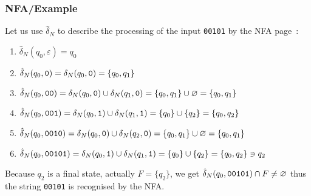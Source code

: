 % 
\begin{frame}[containsverbatim]
\frametitle{NFA/Example}

\label{nfa_01_suffix_formal}

Let us use \(\hat{\delta}_N\) to describe the processing of the input
\verb+00101+ by the NFA page~\pageref{nfa_01_suffix}:
\begin{enumerate}

  \item \(\hat{\delta}_N (q_0, \varepsilon) = q_0\)

  \item \(\hat{\delta}_N (q_0, \verb+0+) = \delta_N (q_0, \verb+0+) =
    \{q_0, q_1\}\) 

  \item \(\hat{\delta}_N (q_0, \verb+00+) = \delta_N (q_0, \verb+0+)
    \cup \delta_N (q_1, \verb+0+) = \{q_0, q_1\} \cup \varnothing =
    \{q_0, q_1\}\)

  \item \(\hat{\delta}_N (q_0, \verb+001+) = \delta_N (q_0, \verb+1+)
    \cup \delta_N (q_1, \verb+1+) = \{q_0\} \cup \{q_2\} = \{q_0,
    q_2\}\)

  \item \(\hat{\delta}_N (q_0, \verb+0010+) = \delta_N (q_0, \verb+0+)
    \cup \delta_N (q_2, \verb+0+) = \{q_0, q_1\} \cup \varnothing =
    \{q_0, q_1\}\)

  \item \(\hat{\delta}_N (q_0, \verb+00101+) = \delta_N (q_0,
    \verb+1+) \cup \delta_N (q_1, \verb+1+) = \{q_0\} \cup \{q_2\} =
    \{q_0, q_2\} \ni q_2\)

\end{enumerate}
Because \(q_2\) is a final state, actually \(F = \{q_2\}\), we get
\(\hat{\delta}_N (q_0, \verb+00101+) \cap F \neq \varnothing\) thus
the string \verb+00101+ is recognised by the NFA.

\end{frame}
